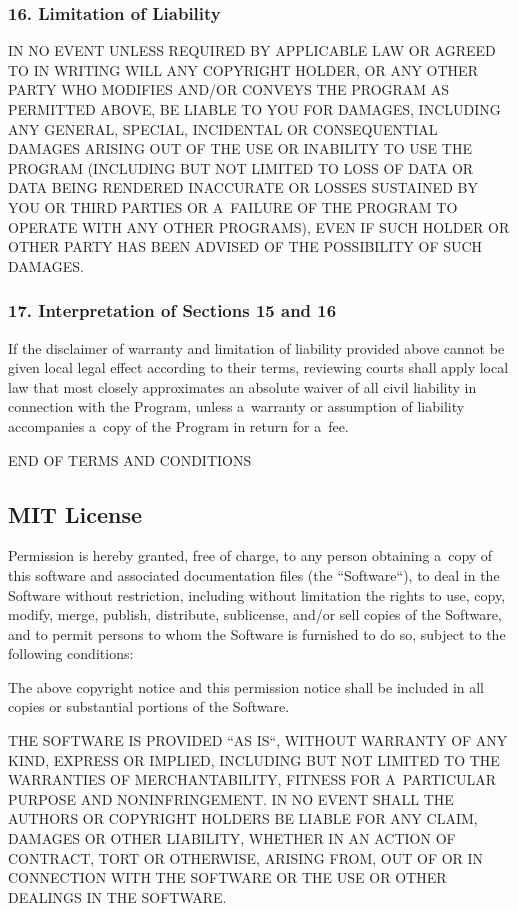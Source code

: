\documentclass[a4paper, 11pt, twoside]{article}
\begin{document}
\subsubsection{16. Limitation of Liability}

IN NO EVENT UNLESS REQUIRED BY APPLICABLE LAW OR AGREED TO IN WRITING WILL ANY COPYRIGHT HOLDER, OR ANY OTHER PARTY WHO MODIFIES AND/OR CONVEYS THE PROGRAM AS PERMITTED ABOVE, BE LIABLE TO YOU FOR DAMAGES, INCLUDING ANY GENERAL, SPECIAL, INCIDENTAL OR CONSEQUENTIAL DAMAGES ARISING OUT OF THE USE OR INABILITY TO USE THE PROGRAM (INCLUDING BUT NOT LIMITED TO LOSS OF DATA OR DATA BEING RENDERED INACCURATE OR LOSSES SUSTAINED BY YOU OR THIRD PARTIES OR A~FAILURE OF THE PROGRAM TO OPERATE WITH ANY OTHER PROGRAMS), EVEN IF SUCH HOLDER OR OTHER PARTY HAS BEEN ADVISED OF THE POSSIBILITY OF SUCH DAMAGES.

\subsubsection{17. Interpretation of Sections 15 and 16}

If the disclaimer of warranty and limitation of liability provided above cannot be given local legal effect according to their terms, reviewing courts shall apply local law that most closely approximates an absolute waiver of all civil liability in connection with the Program, unless a~warranty or assumption of liability accompanies a~copy of the Program in return for a~fee.

END OF TERMS AND CONDITIONS

\subsection{MIT License}

Permission is hereby granted, free of charge, to any person obtaining a~copy of this software and associated documentation files (the “Software“), to deal in the Software without restriction, including without limitation the rights to use, copy, modify, merge, publish, distribute, sublicense, and/or sell copies of the Software, and to permit persons to whom the Software is furnished to do so, subject to the following conditions:

The above copyright notice and this permission notice shall be included in all copies or substantial portions of the Software.

THE SOFTWARE IS PROVIDED “AS IS“, WITHOUT WARRANTY OF ANY KIND, EXPRESS OR IMPLIED, INCLUDING BUT NOT LIMITED TO THE WARRANTIES OF MERCHANTABILITY, FITNESS FOR A~PARTICULAR PURPOSE AND NONINFRINGEMENT. IN NO EVENT SHALL THE AUTHORS OR COPYRIGHT HOLDERS BE LIABLE FOR ANY CLAIM, DAMAGES OR OTHER LIABILITY, WHETHER IN AN ACTION OF CONTRACT, TORT OR OTHERWISE, ARISING FROM, OUT OF OR IN CONNECTION WITH THE SOFTWARE OR THE USE OR OTHER DEALINGS IN THE SOFTWARE.
\end{document}

